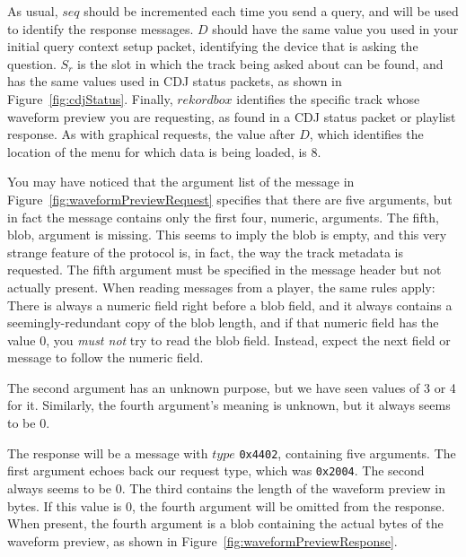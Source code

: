 \documentclass[11pt]{article}
\begin{document}
As usual, $seq$ should be incremented each time you send a query, and
will be used to identify the response messages. $D$ should have the
same value you used in your initial query context setup packet,
identifying the device that is asking the question. $S_r$ is the slot
in which the track being asked about can be found, and has the same
values used in CDJ status packets, as shown in
Figure~\ref{fig:cdjStatus}. Finally, $rekordbox$ identifies the
specific track whose waveform preview you are requesting, as found in
a CDJ status packet or playlist response. As with graphical requests,
the value after $D$, which identifies the location of the menu for
which data is being loaded, is 8.

You may have noticed that the argument list of the message in
Figure~\ref{fig:waveformPreviewRequest} specifies that there are five
arguments, but in fact the message contains only the first four,
numeric, arguments. The fifth, blob, argument is missing. This seems
to imply the blob is empty, and this very strange feature of the
protocol is, in fact, the way the track metadata is requested. The
fifth argument must be specified in the message header but not
actually present. When reading messages from a player, the same rules
apply: There is always a numeric field right before a blob field, and
it always contains a seemingly-redundant copy of the blob length, and
if that numeric field has the value $0$, you \emph{must not} try to
read the blob field. Instead, expect the next field or message to
follow the numeric field.

The second argument has an unknown purpose, but we have seen values of
3 or 4 for it. Similarly, the fourth argument's meaning is unknown,
but it always seems to be 0.

The response will be a message with $type$ {\tt 0x4402}, containing
five arguments. The first argument echoes back our request type, which
was {\tt 0x2004}. The second always seems to be 0. The third contains
the length of the waveform preview in bytes. If this value is 0, the
fourth argument will be omitted from the response. When present, the
fourth argument is a blob containing the actual bytes of the waveform
preview, as shown in Figure~\ref{fig:waveformPreviewResponse}.
\end{document}
